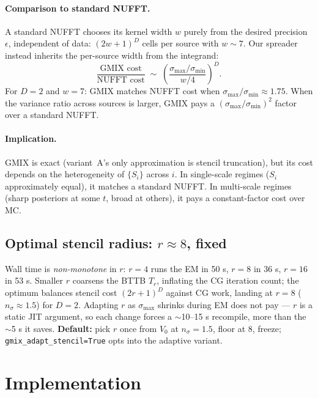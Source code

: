 \documentclass[11pt]{article}
\newcommand{\code}[1]{\texttt{\small #1}}
\begin{document}
\paragraph{Comparison to standard NUFFT.}
A standard NUFFT chooses its kernel width $w$ purely from the desired
precision $\epsilon$, independent of data: $(2w+1)^D$ cells per source
with $w \sim 7$.  Our spreader instead inherits the per-source width
from the integrand:
\begin{equation}
\frac{\text{GMIX cost}}{\text{NUFFT cost}}
\;\sim\;
\left(\frac{\sigma_{\max}/\sigma_{\min}}{w/4}\right)^D.
\end{equation}
For $D\!=\!2$ and $w\!=\!7$: GMIX matches NUFFT cost when
$\sigma_{\max}/\sigma_{\min} \approx 1.75$.  When the variance ratio
across sources is larger, GMIX pays a $(\sigma_{\max}/\sigma_{\min})^2$
factor over a standard NUFFT.

\paragraph{Implication.}
GMIX is exact (variant~A's only approximation is stencil truncation),
but its cost depends on the heterogeneity of $\{S_i\}$ across $i$.  In
single-scale regimes ($S_i$ approximately equal), it matches a
standard NUFFT.  In multi-scale regimes (sharp posteriors at some $t$,
broad at others), it pays a constant-factor cost over MC.

\subsection{Optimal stencil radius: $r\!\approx\!8$, fixed}
\label{sec:r-empirics}

Wall time is \emph{non-monotone} in $r$: $r\!=\!4$ runs the EM in 50 s,
$r\!=\!8$ in 36 s, $r\!=\!16$ in 53 s.  Smaller $r$ coarsens the BTTB
$T_r$, inflating the CG iteration count; the optimum balances stencil
cost $(2r+1)^D$ against CG work, landing at $r\!=\!8$
($n_\sigma\!\approx\!1.5$) for $D\!=\!2$.  Adapting $r$ as
$\sigma_{\max}$ shrinks during EM does not pay --- $r$ is a static JIT
argument, so each change forces a $\sim$10--15 s recompile, more than
the $\sim$5 s it saves.  \textbf{Default:} pick $r$ once from $V_0$ at
$n_\sigma\!=\!1.5$, floor at 8, freeze; \code{gmix\_adapt\_stencil=True}
opts into the adaptive variant.

\section{Implementation}
\label{sec:impl}
\end{document}
